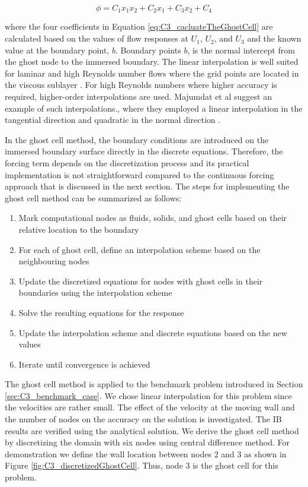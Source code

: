 \begin{equation}\label{eq:C3_cacluateTheGhostCell}
    \phi = C_1 x_1 x_2 + C_2 x_1 + C_3 x_2 + C_4
\end{equation}

where the four coefficients in Equation \eqref{eq:C3_cacluateTheGhostCell} are calculated based on the values of flow responses at $U_1$, $U_2$, and $U_3$ and the known value at the boundary point, $b$. Boundary points $b$, is the normal intercept from the ghost node to the immersed boundary. The linear interpolation is well suited for laminar and high Reynolds number flows where the grid points are located in the viscous sublayer \cite{iaccarino2003immersed}. For high Reynolds numbers where higher accuracy is required, higher-order interpolations are used. Majumdat et al suggest an example of such interpolations., where they employed a linear interpolation in the tangential direction and quadratic in the normal direction \cite{majumdar2001rans}. 

In the ghost cell method, the boundary conditions are introduced on the immersed boundary surface directly in the discrete equations. Therefore, the forcing term depends on the discretization process and its practical implementation is not straightforward compared to the continuous forcing approach that is discussed in the next section. The steps for implementing the ghost cell method can be summarized as follows:

\begin{enumerate}
    \item Mark computational nodes as fluids, solids, and ghost cells based on their relative location to the boundary
    \item For each of ghost cell, define an interpolation scheme based on the neighbouring nodes
    \item Update the discretized equations for nodes with ghost cells in their boundaries using the interpolation scheme
    \item Solve the resulting equations for the response
    \item Update the interpolation scheme and discrete equations based on the new values
    \item Iterate until convergence is achieved
\end{enumerate}

The ghost cell method is applied to the benchmark problem introduced in Section \ref{sec:C3_benchmark_case}. We chose linear interpolation for this problem since the velocities are rather small. The effect of the velocity at the moving wall and the number of nodes on the accuracy on the solution is investigated. The IB results are verified using the analytical solution. We derive the ghost cell method by discretizing the domain with six nodes using central difference method. For demonstration we define the wall location between nodes $2$ and $3$ as shown in Figure \ref{fig:C3_discretizedGhostCell}. Thus, node $3$ is the ghost cell for this problem.

